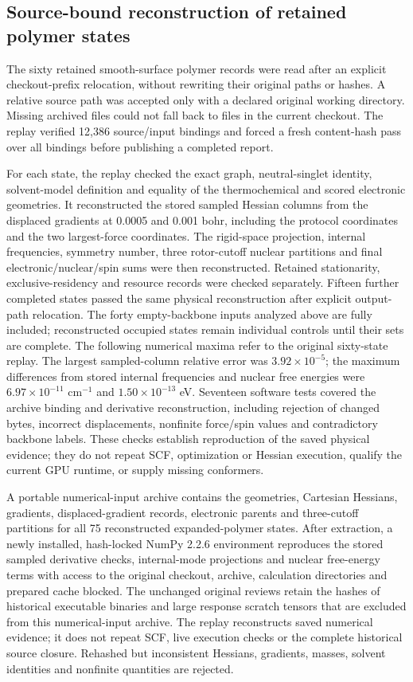 \documentclass[11pt]{article}
\begin{document}
\subsection{Source-bound reconstruction of retained polymer states}
The sixty retained smooth-surface polymer records were read after an explicit checkout-prefix relocation, without rewriting their original paths or hashes. A relative source path was accepted only with a declared original working directory. Missing archived files could not fall back to files in the current checkout. The replay verified 12,386 source/input bindings and forced a fresh content-hash pass over all bindings before publishing a completed report.

For each state, the replay checked the exact graph, neutral-singlet identity, solvent-model definition and equality of the thermochemical and scored electronic geometries. It reconstructed the stored sampled Hessian columns from the displaced gradients at 0.0005 and 0.001 bohr, including the protocol coordinates and the two largest-force coordinates. The rigid-space projection, internal frequencies, symmetry number, three rotor-cutoff nuclear partitions and final electronic/nuclear/spin sums were then reconstructed. Retained stationarity, exclusive-residency and resource records were checked separately. Fifteen further completed states passed the same physical reconstruction after explicit output-path relocation. The forty empty-backbone inputs analyzed above are fully included; reconstructed occupied states remain individual controls until their sets are complete. The following numerical maxima refer to the original sixty-state replay. The largest sampled-column relative error was $3.92\times10^{-5}$; the maximum differences from stored internal frequencies and nuclear free energies were $6.97\times10^{-11}$ cm$^{-1}$ and $1.50\times10^{-13}$ eV. Seventeen software tests covered the archive binding and derivative reconstruction, including rejection of changed bytes, incorrect displacements, nonfinite force/spin values and contradictory backbone labels. These checks establish reproduction of the saved physical evidence; they do not repeat SCF, optimization or Hessian execution, qualify the current GPU runtime, or supply missing conformers.

A portable numerical-input archive contains the geometries, Cartesian Hessians, gradients, displaced-gradient records, electronic parents and three-cutoff partitions for all 75 reconstructed expanded-polymer states. After extraction, a newly installed, hash-locked NumPy 2.2.6 environment reproduces the stored sampled derivative checks, internal-mode projections and nuclear free-energy terms with access to the original checkout, archive, calculation directories and prepared cache blocked. The unchanged original reviews retain the hashes of historical executable binaries and large response scratch tensors that are excluded from this numerical-input archive. The replay reconstructs saved numerical evidence; it does not repeat SCF, live execution checks or the complete historical source closure. Rehashed but inconsistent Hessians, gradients, masses, solvent identities and nonfinite quantities are rejected.
\end{document}
